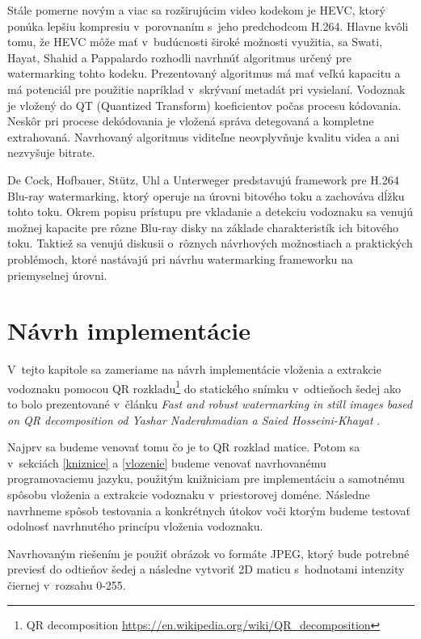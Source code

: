 Stále pomerne novým a viac sa rozširujúcim video kodekom je HEVC, ktorý ponúka lepšiu kompresiu v~porovnaním s~jeho predchodcom H.264. Hlavne kvôli tomu, že HEVC môže mať v~budúcnosti široké možnosti využitia, sa Swati, Hayat, Shahid a Pappalardo \cite{Swati2014} rozhodli navrhnúť algoritmus určený pre watermarking tohto kodeku. Prezentovaný algoritmus má mať veľkú kapacitu a má potenciál pre použitie napríklad v~skrývaní metadát pri vysielaní. Vodoznak je vložený do QT (Quantized Transform) koeficientov počas procesu kódovania. Neskôr pri procese dekódovania je vložená správa detegovaná a kompletne extrahovaná. Navrhovaný algoritmus viditeľne neovplyvňuje kvalitu videa a ani nezvyšuje bitrate.

De Cock, Hofbauer, Stütz, Uhl a Unterweger \cite{DeCock2015} predstavujú framework pre H.264 \mbox{Blu-ray} watermarking, ktorý operuje na úrovni bitového toku a zachováva dĺžku tohto toku. Okrem popisu prístupu pre vkladanie a detekciu vodoznaku sa venujú možnej kapacite pre rôzne \mbox{Blu-ray} disky na základe charakteristík ich bitového toku. Taktiež sa venujú diskusii o~rôznych návrhových možnostiach a praktických problémoch, ktoré nastávajú pri návrhu watermarking frameworku na priemyselnej úrovni.

\chapter{Návrh implementácie}
\label{ch-design}
V~tejto kapitole sa zameriame na návrh implementácie vloženia a extrakcie vodoznaku pomocou QR rozkladu\footnote{QR decomposition \url{https://en.wikipedia.org/wiki/QR_decomposition}} do statického snímku v~odtieňoch šedej ako to bolo prezentované v~článku {\it Fast and robust watermarking in still images based on QR decomposition od Yashar Naderahmadian a Saied Hosseini-Khayat} \cite{QRdecomposition}.

Najprv sa budeme venovať tomu čo je to QR rozklad matice. Potom sa v~sekciách \ref{kniznice} a \ref{vlozenie} budeme venovať navrhovanému programovaciemu jazyku, použitým knižniciam pre implementáciu a samotnému spôsobu vloženia a extrakcie vodoznaku v~priestorovej doméne. Následne navrhneme spôsob testovania a konkrétnych útokov voči ktorým budeme testovať odolnosť navrhnutého princípu vloženia vodoznaku.

Navrhovaným riešením je použiť obrázok vo formáte JPEG, ktorý bude potrebné previesť do odtieňov šedej a následne vytvoriť 2D maticu s~hodnotami intenzity čiernej v~rozsahu 0-255.

